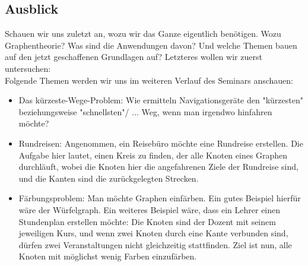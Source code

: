 \documentclass{article}
\theoremstyle{plain}
\begin{document}
\subsection{Ausblick}
Schauen wir uns zuletzt an, wozu wir das Ganze eigentlich benötigen. Wozu Graphentheorie? Was sind die Anwendungen davon? Und welche Themen bauen auf den jetzt geschaffenen Grundlagen auf? Letzteres wollen wir zuerst untersuchen:\\
Folgende Themen werden wir uns im weiteren Verlauf des Seminars anschauen:\\
\begin{itemize}
	\item{Das kürzeste-Wege-Problem: Wie ermitteln Navigationsgeräte den "kürzesten" beziehungsweise "schnellsten"/ $\ldots$ Weg, wenn man irgendwo hinfahren möchte?}
	\item{Rundreisen: Angenommen, ein Reisebüro möchte eine Rundreise erstellen. Die Aufgabe hier lautet, einen Kreis zu finden, der alle Knoten eines Graphen durchläuft, wobei die Knoten hier die angefahrenen Ziele der Rundreise sind, und die Kanten sind die zurückgelegten Strecken.}
	\item{Färbungsproblem: Man möchte Graphen einfärben. Ein gutes Beispiel hierfür wäre der Würfelgraph. Ein weiteres Beispiel wäre, dass ein Lehrer einen Stundenplan erstellen möchte: Die Knoten sind der Dozent mit seinem jeweiligen Kurs, und wenn zwei Knoten durch eine Kante verbunden sind, dürfen zwei Veranstaltungen nicht gleichzeitig stattfinden. Ziel ist nun, alle Knoten mit möglichst wenig Farben einzufärben.}
\end{itemize}
\end{document}
